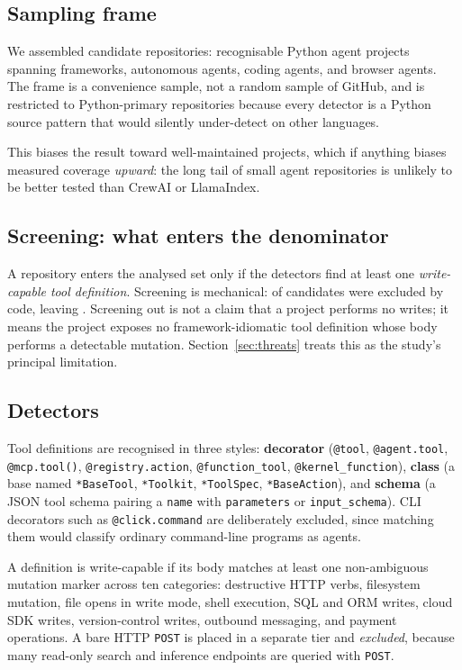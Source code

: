 \documentclass[11pt]{article}
\begin{document}
\subsection{Sampling frame}

We assembled \AcCandidates{} candidate repositories: recognisable Python agent
projects spanning frameworks, autonomous agents, coding agents, and browser agents.
The frame is a convenience sample, not a random sample of GitHub, and is restricted to
Python-primary repositories because every detector is a Python source pattern that
would silently under-detect on other languages.

This biases the result toward well-maintained projects, which if anything biases
measured coverage \emph{upward}: the long tail of small agent repositories is unlikely
to be better tested than CrewAI or LlamaIndex.

\subsection{Screening: what enters the denominator}

A repository enters the analysed set only if the detectors find at least one
\emph{write-capable tool definition}. Screening is mechanical: \AcScreenedOut{} of
\AcCandidates{} candidates were excluded by code, leaving \AcRepos{}. Screening out is
not a claim that a project performs no writes; it means the project exposes no
framework-idiomatic tool definition whose body performs a detectable mutation.
Section~\ref{sec:threats} treats this as the study's principal limitation.

\subsection{Detectors}

Tool definitions are recognised in three styles: \textbf{decorator}
(\texttt{@tool}, \texttt{@agent.tool}, \texttt{@mcp.tool()}, \texttt{@registry.action},
\texttt{@function\_tool}, \texttt{@kernel\_function}), \textbf{class} (a base named
\texttt{*BaseTool}, \texttt{*Toolkit}, \texttt{*ToolSpec}, \texttt{*BaseAction}), and
\textbf{schema} (a JSON tool schema pairing a \texttt{name} with \texttt{parameters} or
\texttt{input\_schema}). CLI decorators such as \texttt{@click.command} are deliberately
excluded, since matching them would classify ordinary command-line programs as agents.

A definition is write-capable if its body matches at least one non-ambiguous mutation
marker across ten categories: destructive HTTP verbs, filesystem mutation, file opens
in write mode, shell execution, SQL and ORM writes, cloud SDK writes, version-control
writes, outbound messaging, and payment operations. A bare HTTP \texttt{POST} is placed
in a separate tier and \emph{excluded}, because many read-only search and inference
endpoints are queried with \texttt{POST}.
\end{document}

